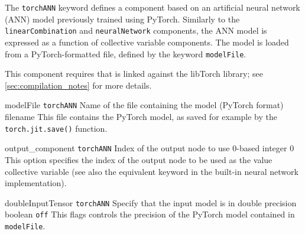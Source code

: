 
The \texttt{torchANN} keyword defines a component based on an artificial neural network (ANN) model previously trained using PyTorch. Similarly to the \texttt{linearCombination} and \texttt{neuralNetwork} components, the ANN model is expressed as a function of collective variable components. The model is loaded from a PyTorch-formatted file, defined by the keyword \texttt{modelFile}.

This component requires that \MDENGINE{} is linked against the libTorch library; see \ref{sec:compilation_notes} for more details.

\begin{cvcoptions}

\item %
  \key
    {modelFile}{%
    \texttt{torchANN}}{%
    Name of the file containing the model (PyTorch format)}{%
    filename}{%
    This file contains the PyTorch model, as saved for example by the \texttt{torch.jit.save()} function.
  }

\item %
  \keydef
    {output\_component}{%
    \texttt{torchANN}}{%
    Index of the output node to use}{%
    0-based integer}{%
    0}{%
    This option specifies the index of the output node to be used as the value collective variable (see also the equivalent keyword  in the built-in neural network implementation).
  }

\item %
  \keydef
    {doubleInputTensor}{%
    \texttt{torchANN}}{%
    Specify that the input model is in double precision}{%
    boolean}{%
    \texttt{off}}{%
    This flags controls the precision of the PyTorch model contained in \texttt{modelFile}.
  }

\end{cvcoptions}


